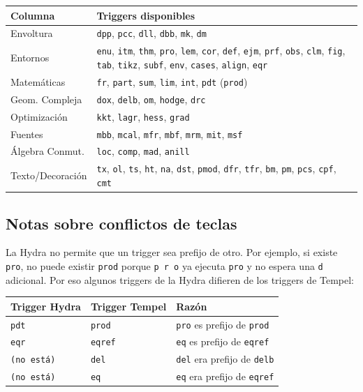 \documentclass[11pt]{article}
\begin{document}
\begin{center}
\begin{tabular}{ll}
Columna & Triggers disponibles\\
\hline
Envoltura & \texttt{dpp}, \texttt{pcc}, \texttt{dll}, \texttt{dbb}, \texttt{mk}, \texttt{dm}\\
Entornos & \texttt{enu}, \texttt{itm}, \texttt{thm}, \texttt{pro}, \texttt{lem}, \texttt{cor}, \texttt{def}, \texttt{ejm}, \texttt{prf}, \texttt{obs}, \texttt{clm}, \texttt{fig}, \texttt{tab}, \texttt{tikz}, \texttt{subf}, \texttt{env}, \texttt{cases}, \texttt{align}, \texttt{eqr}\\
Matemáticas & \texttt{fr}, \texttt{part}, \texttt{sum}, \texttt{lim}, \texttt{int}, \texttt{pdt} (\texttt{prod})\\
Geom. Compleja & \texttt{dox}, \texttt{delb}, \texttt{om}, \texttt{hodge}, \texttt{drc}\\
Optimización & \texttt{kkt}, \texttt{lagr}, \texttt{hess}, \texttt{grad}\\
Fuentes & \texttt{mbb}, \texttt{mcal}, \texttt{mfr}, \texttt{mbf}, \texttt{mrm}, \texttt{mit}, \texttt{msf}\\
Álgebra Conmut. & \texttt{loc}, \texttt{comp}, \texttt{mad}, \texttt{anill}\\
Texto/Decoración & \texttt{tx}, \texttt{ol}, \texttt{ts}, \texttt{ht}, \texttt{na}, \texttt{dst}, \texttt{pmod}, \texttt{dfr}, \texttt{tfr}, \texttt{bm}, \texttt{pm}, \texttt{pcs}, \texttt{cpf}, \texttt{cmt}\\
\end{tabular}
\end{center}
\subsection{Notas sobre conflictos de teclas}
\label{sec:org2d75e00}

La Hydra no permite que un trigger sea prefijo de otro. Por ejemplo, si existe \texttt{pro}, no puede existir \texttt{prod} porque \texttt{p r o} ya ejecuta \texttt{pro} y no espera una \texttt{d} adicional. Por eso algunos triggers de la Hydra difieren de los triggers de Tempel:

\begin{center}
\begin{tabular}{lll}
Trigger Hydra & Trigger Tempel & Razón\\
\hline
\texttt{pdt} & \texttt{prod} & \texttt{pro} es prefijo de \texttt{prod}\\
\texttt{eqr} & \texttt{eqref} & \texttt{eq} es prefijo de \texttt{eqref}\\
\texttt{(no está)} & \texttt{del} & \texttt{del} era prefijo de \texttt{delb}\\
\texttt{(no está)} & \texttt{eq} & \texttt{eq} era prefijo de \texttt{eqref}\\
\end{tabular}
\end{center}
\end{document}
